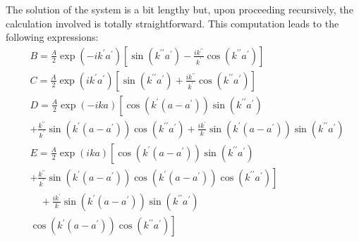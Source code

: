 \documentclass{article}
\begin{document}
The solution of the system is a bit lengthy but, upon proceeding recursively, the calculation involved is totally straightforward. This computation leads to the following expressions:
$$
\begin{align*}
& B= \frac{A}{2} \exp \left(-i k^{\prime} a^{\prime}\right)\left[\sin \left(k^{\prime \prime} a^{\prime}\right)-\frac{i k^{\prime \prime}}{k^{\prime}} \cos \left(k^{\prime \prime} a^{\prime}\right)\right]  \tag{4.7.13a}\\
& C= \frac{A}{2} \exp \left(i k^{\prime} a^{\prime}\right)\left[\sin \left(k^{\prime \prime} a^{\prime}\right)+\frac{i k^{\prime \prime}}{k^{\prime}} \cos \left(k^{\prime \prime} a^{\prime}\right)\right]  \tag{4.7.13b}\\
& D= \frac{A}{2} \exp (-i k a)\left[\cos \left(k^{\prime}\left(a-a^{\prime}\right)\right) \sin \left(k^{\prime \prime} a^{\prime}\right)\right.  \tag{4.7.13c}\\
&+\frac{k^{\prime \prime}}{k^{\prime}} \sin \left(k^{\prime}\left(a-a^{\prime}\right)\right) \cos \left(k^{\prime \prime} a^{\prime}\right)+\frac{i k^{\prime}}{k} \sin \left(k^{\prime}\left(a-a^{\prime}\right)\right) \sin \left(k^{\prime \prime} a^{\prime}\right) \\
& E=\frac{A}{2} \exp (i k a)\left[\cos \left(k^{\prime}\left(a-a^{\prime}\right)\right) \sin \left(k^{\prime \prime} a^{\prime}\right)\right. \\
&\left.+\frac{k^{\prime \prime}}{k^{\prime}} \sin \left(k^{\prime}\left(a-a^{\prime}\right)\right) \cos \left(k^{\prime}\left(a-a^{\prime}\right)\right) \cos \left(k^{\prime \prime} a^{\prime}\right)\right]  \tag{4.7.13d}\\
& \quad+\frac{i k^{\prime}}{k} \sin \left(k^{\prime}\left(a-a^{\prime}\right)\right) \sin \left(k^{\prime \prime} a^{\prime}\right) \\
&\left.\cos \left(k^{\prime}\left(a-a^{\prime}\right)\right) \cos \left(k^{\prime \prime} a^{\prime}\right)\right]
\end{align*}
$$
\end{document}
